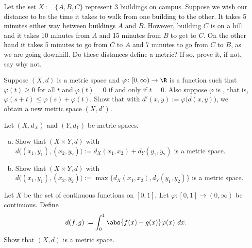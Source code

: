 \documentclass[12pt]{book}
\begin{document}
\begin{exercise}
Let the set $X := \{ A, B, C \}$ represent 3 buildings on campus.
Suppose we
wish our distance to be the time it takes to walk from one building to
the other.
It takes 5 minutes either way between buildings $A$ and $B$.
However,
building $C$ is on a hill and it takes 10 minutes from $A$ and 15 minutes
from $B$ to get to $C$.
On the other hand it takes 5 minutes to go
from $C$ to $A$ and 7 minutes to go from $C$ to $B$, as we are going
downhill.
Do these distances define a metric?
  If so, prove it, if not, say
why not.
\end{exercise}

\begin{exercise}
Suppose $(X,d)$ is a metric space and
$\varphi \colon [0,\infty) \to \R$ is
a function such that 
$\varphi(t) \geq 0$ for all $t$ and $\varphi(t) = 0$ if and only if
$t=0$.
Also suppose $\varphi$ is \emph{},
that is, $\varphi(s+t) \leq \varphi(s)+\varphi(t)$.
Show that with $d'(x,y) := \varphi\bigl(d(x,y)\bigr)$, we obtain a new
metric space $(X,d')$.
\end{exercise}

\begin{exercise} \label{exercise:mscross}
Let $(X,d_X)$ and $(Y,d_Y)$ be metric spaces.
\begin{enumerate}[a)]
 \item Show that $(X \times Y,d)$ with
$d\bigl( (x_1,y_1), (x_2,y_2) \bigr) := d_X(x_1,x_2) + d_Y(y_1,y_2)$ is a metric space.
\item Show that $(X \times Y,d)$ with
$d\bigl( (x_1,y_1), (x_2,y_2) \bigr) := \max \{ d_X(x_1,x_2) , d_Y(y_1,y_2) \}$ is
a metric space.
\end{enumerate}
\end{exercise}

\begin{exercise}
Let $X$ be the set of continuous functions on $[0,1]$.
Let $\varphi \colon
[0,1] \to (0,\infty)$ be continuous.
Define
\begin{equation*}
d(f,g) := \int_0^1 \abs{f(x)-g(x)}\varphi(x)~dx .
\end{equation*}
Show that $(X,d)$ is a metric space.
\end{exercise}

\pagebreak[2]
\end{document}

